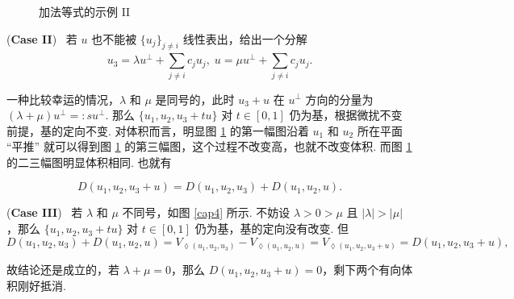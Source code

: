 \documentclass[10pt,openany]{article}
\theoremstyle{thmstyle} %
\theoremstyle{defstyle} %
\theoremstyle{prostyle} %
\theoremstyle{exastyle}
\theoremstyle{remstyle}
\begin{document}
\begin{enumerate}[(i)]
\begin{figure}[htbp!]
\begin{minipage}{0.3\linewidth}
		\end{minipage}
		\caption{加法等式的示例 II}
		\label{cap3}
	\end{figure}
	
	\vspace{2ex}
	
	(\textbf{Case II}) \ 若 \( u \) 也不能被 \( \{u_j\}_{j \neq i} \) 线性表出，给出一个分解
	\[ u_3=\lambda u^{\perp}+ \sum_{j \neq i}^{} c_ju_j, \; u=\mu u^{\perp}+ \sum_{j \neq i}^{} c_ju_j. \]
	
	一种比较幸运的情况，\( \lambda \) 和 \( \mu \) 是同号的，此时 \( u_3+u \) 在 \( u^{\perp} \) 方向的分量为 \( (\lambda+\mu) u^{\perp}=:su^{\perp} \). 那么 \( \{ u_1,u_2,u_3+tu\} \) 对 \( t \in [0,1] \) 仍为基，根据微扰不变前提，基的定向不变. 对体积而言，明显图 \ref{cap3} 的第一幅图沿着 \( u_1 \) 和 \( u_2 \) 所在平面 “平推” 就可以得到图 \ref{cap3} 的第三幅图，这个过程不改变高，也就不改变体积. 而图 \ref{cap3} 的二三幅图明显体积相同. 也就有
	
	\[ D(u_1,u_2,u_3+u)=D(u_1,u_2,u_3)+D(u_1,u_2,u). \]

	
    (\textbf{Case III}) \ 若 \( \lambda \) 和 \( \mu \) 不同号，如图 \ref{cap4} 所示. 不妨设 \( \lambda>0>\mu \) 且 \( |\lambda|>|\mu| \)，那么 \( \{ u_1,u_2,u_3+tu\} \) 对 \( t \in [0,1] \) 仍为基，基的定向没有改变. 但 
    \[ D(u_1,u_2,u_3)+D(u_1,u_2,u)=V_{\lozenge(u_1,u_2,u_3)}-V_{\lozenge(u_1,u_2,u)}=V_{\lozenge(u_1,u_2,u_3+u)}=D(u_1,u_2,u_3+u), \]
    
    故结论还是成立的，若 \( \lambda+\mu=0 \)，那么 \( D(u_1,u_2,u_3+u) =0 \)，剩下两个有向体积刚好抵消.
	

\end{enumerate}
\end{document}
